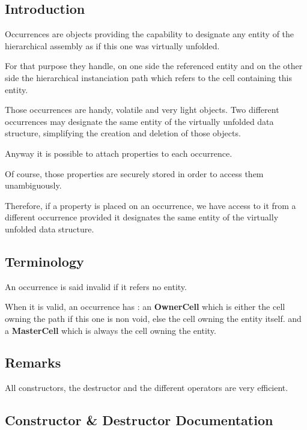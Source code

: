 \hypertarget{classHurricane_1_1Occurrence_secOccurrenceIntro}{}\subsection{Introduction}\label{classHurricane_1_1Occurrence_secOccurrenceIntro}
Occurrences are objects providing the capability to designate any entity of the hierarchical assembly as if this one was virtually unfolded.

For that purpose they handle, on one side the referenced entity and on the other side the hierarchical instanciation path which refers to the cell containing this entity.

Those occurrences are handy, volatile and very light objects. Two different occurrences may designate the same entity of the virtually unfolded data structure, simplifying the creation and deletion of those objects.

Anyway it is possible to attach properties to each occurrence.

Of course, those properties are securely stored in order to access them unambiguously.

Therefore, if a property is placed on an occurrence, we have access to it from a different occurrence provided it designates the same entity of the virtually unfolded data structure.\hypertarget{classHurricane_1_1Occurrence_secOccurrenceTerminology}{}\subsection{Terminology}\label{classHurricane_1_1Occurrence_secOccurrenceTerminology}
An occurrence is said invalid if it refers no entity.

When it is valid, an occurrence has \+: an {\bfseries Owner\+Cell} which is either the cell owning the path if this one is non void, else the cell owning the entity itself. and a {\bfseries Master\+Cell} which is always the cell owning the entity.\hypertarget{classHurricane_1_1Occurrence_secOccurrenceRemarks}{}\subsection{Remarks}\label{classHurricane_1_1Occurrence_secOccurrenceRemarks}
All constructors, the destructor and the different operators are very efficient. 

\subsection{Constructor \& Destructor Documentation}
\mbox{\label{classHurricane_1_1Occurrence_aa4162a36dc984d71caf962e55b991ed0}} 
